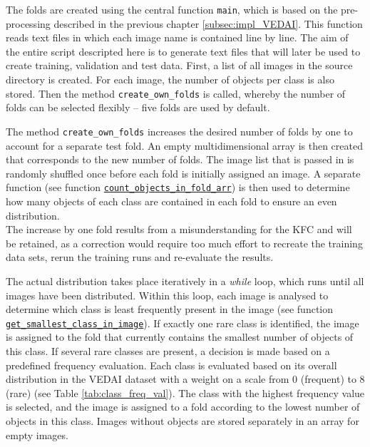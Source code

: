 The folds are created using the central function \lstinline|main|, which is based on the pre-processing described in the previous chapter \ref{subsec:impl_VEDAI}. This function reads text files in which each image name is contained line by line. The aim of the entire script descripted here is to generate text files that will later be used to create training, validation and test data. First, a list of all images in the source directory is created. For each image, the number of objects per class is also stored. Then the method \lstinline|create_own_folds| is called, whereby the number of folds can be selected flexibly – five folds are used by default.

The method \lstinline|create_own_folds| increases the desired number of folds by one to account for a separate test fold. An empty multidimensional array is then created that corresponds to the new number of folds. The image list that is passed in is randomly shuffled once before each fold is initially assigned an image. A separate function (see function \hyperlink{par:count_objects_in_fold_arr}{\lstinline|count_objects_in_fold_arr|}) is then used to determine how many objects of each class are contained in each fold to ensure an even distribution.\\
The increase by one fold results from a misunderstanding for the \acrshort{KFC} and will be retained, as a correction would require too much effort to recreate the training data sets, rerun the training runs and re-evaluate the results.

The actual distribution takes place iteratively in a \textit{while} loop, which runs until all images have been distributed. Within this loop, each image is analysed to determine which class is least frequently present in the image (see function \hyperlink{par:get_smallest_class_in_image}{\lstinline|get_smallest_class_in_image|}). If exactly one rare class is identified, the image is assigned to the fold that currently contains the smallest number of objects of this class. If several rare classes are present, a decision is made based on a predefined frequency evaluation. Each class is evaluated based on its overall distribution in the \acrshort{VEDAI} dataset with a weight on a scale from 0 (frequent) to 8 (rare) (see Table \ref{tab:class_freq_val}). The class with the highest frequency value is selected, and the image is assigned to a fold according to the lowest number of objects in this class. Images without objects are stored separately in an array for empty images.

